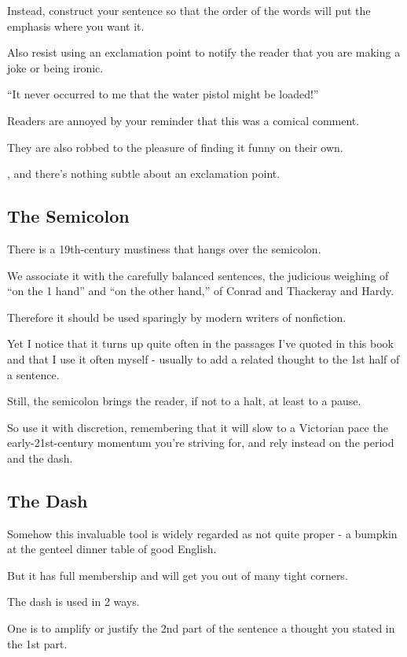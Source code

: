 \documentclass{book}
\numberwithin{equation}{section}
\begin{document}
Instead, construct your sentence so that the order of the words will put the emphasis where you want it.

Also resist using an exclamation point to notify the reader that you are making a joke or being ironic.

``It never occurred to me that the water pistol might be loaded!''

Readers are annoyed by your reminder that this was a comical comment.

They are also robbed to the pleasure of finding it funny on their own.

, and there's nothing subtle about an exclamation point.

\subsection{The Semicolon}
There is a 19th-century mustiness that hangs over the semicolon.

We associate it with the carefully balanced sentences, the judicious weighing of ``on the 1 hand'' and ``on the other hand,'' of Conrad and Thackeray and Hardy.

Therefore it should be used sparingly by modern writers of nonfiction.

Yet I notice that it turns up quite often in the passages I've quoted in this book and that I use it often myself - usually to add a related thought to the 1st half of a sentence.

Still, the semicolon brings the reader, if not to a halt, at least to a pause.

So use it with discretion, remembering that it will slow to a Victorian pace the early-21st-century momentum you're striving for, and rely instead on the period and the dash.

\subsection{The Dash}
Somehow this invaluable tool is widely regarded as not quite proper - a bumpkin at the genteel dinner table of good English.

But it has full membership and will get you out of many tight corners.

The dash is used in 2 ways.

One is to amplify or justify the 2nd part of the sentence a thought you stated in the 1st part.
\end{document}
